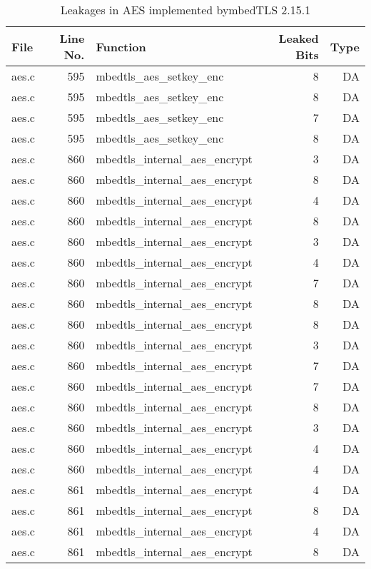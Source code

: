 \begin{table}%
\centering\tiny\scriptsize
\renewcommand{\baselinestretch}{0.96}\selectfont
\caption{Leakages in AES implemented bymbedTLS 2.15.1}\label{tab:AESmbedTLS2.15.1}
\begin{tabular}{lrlrr}
\hline
\textbf{File} & \textbf{Line No.} & \textbf{Function} & \textbf{Leaked Bits} & \textbf{Type} \\\hline
aes.c& 595&mbedtls\_aes\_setkey\_enc&8 &DA\\
aes.c& 595&mbedtls\_aes\_setkey\_enc&8 &DA\\
aes.c& 595&mbedtls\_aes\_setkey\_enc&7 &DA\\
aes.c& 595&mbedtls\_aes\_setkey\_enc&8 &DA\\
aes.c& 860&mbedtls\_internal\_aes\_encrypt&3 &DA\\
aes.c& 860&mbedtls\_internal\_aes\_encrypt&8 &DA\\
aes.c& 860&mbedtls\_internal\_aes\_encrypt&4 &DA\\
aes.c& 860&mbedtls\_internal\_aes\_encrypt&8 &DA\\
aes.c& 860&mbedtls\_internal\_aes\_encrypt&3 &DA\\
aes.c& 860&mbedtls\_internal\_aes\_encrypt&4 &DA\\
aes.c& 860&mbedtls\_internal\_aes\_encrypt&7 &DA\\
aes.c& 860&mbedtls\_internal\_aes\_encrypt&8 &DA\\
aes.c& 860&mbedtls\_internal\_aes\_encrypt&8 &DA\\
aes.c& 860&mbedtls\_internal\_aes\_encrypt&3 &DA\\
aes.c& 860&mbedtls\_internal\_aes\_encrypt&7 &DA\\
aes.c& 860&mbedtls\_internal\_aes\_encrypt&7 &DA\\
aes.c& 860&mbedtls\_internal\_aes\_encrypt&8 &DA\\
aes.c& 860&mbedtls\_internal\_aes\_encrypt&3 &DA\\
aes.c& 860&mbedtls\_internal\_aes\_encrypt&4 &DA\\
aes.c& 860&mbedtls\_internal\_aes\_encrypt&4 &DA\\
aes.c& 861&mbedtls\_internal\_aes\_encrypt&4 &DA\\
aes.c& 861&mbedtls\_internal\_aes\_encrypt&8 &DA\\
aes.c& 861&mbedtls\_internal\_aes\_encrypt&4 &DA\\
aes.c& 861&mbedtls\_internal\_aes\_encrypt&8 &DA\\

\end{tabular}
\end{table}
